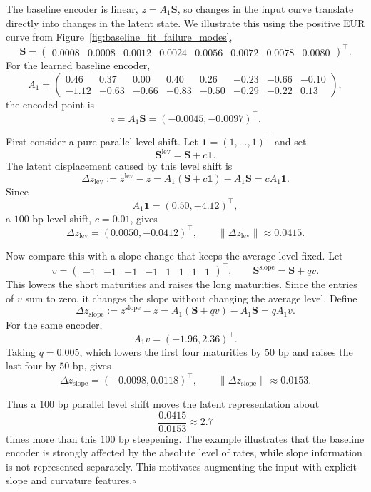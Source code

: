 \begin{example}\label{ex:level_shape_entanglement}
The baseline encoder is linear, \(z=A_1\mathbf S\), so changes in the input curve translate directly into changes in the latent state. We illustrate this using the positive EUR curve from Figure~\ref{fig:baseline_fit_failure_modes},
\[
\mathbf S
=
\begin{pmatrix}
0.0008 & 0.0008 & 0.0012 & 0.0024 &
0.0056 & 0.0072 & 0.0078 & 0.0080
\end{pmatrix}^{\top}.
\]
For the learned baseline encoder,
\[
A_1 =
\begin{pmatrix}
0.46 & 0.37 & 0.00 & 0.40 & 0.26 & -0.23 & -0.66 & -0.10 \\
-1.12 & -0.63 & -0.66 & -0.83 & -0.50 & -0.29 & -0.22 & 0.13
\end{pmatrix},
\]
the encoded point is
\[
z=A_1\mathbf S
=
(-0.0045,-0.0097)^\top.
\]

First consider a pure parallel level shift. Let \(\mathbf 1=(1,\ldots,1)^\top\) and set
\[
\mathbf S^{\mathrm{lev}}=\mathbf S+c\mathbf 1.
\]
The latent displacement caused by this level shift is
\[
\Delta z_{\mathrm{lev}}
:=
z^{\mathrm{lev}}-z
=
A_1(\mathbf S+c\mathbf 1)-A_1\mathbf S
=
cA_1\mathbf 1.
\]
Since
\[
A_1\mathbf 1=(0.50,-4.12)^\top,
\]
a \(100\) bp level shift, \(c=0.01\), gives
\[
\Delta z_{\mathrm{lev}}
=
(0.0050,-0.0412)^\top,
\qquad
\|\Delta z_{\mathrm{lev}}\|\approx 0.0415.
\]

Now compare this with a slope change that keeps the average level fixed. Let
\[
v=
\begin{pmatrix}
-1 & -1 & -1 & -1 & 1 & 1 & 1 & 1
\end{pmatrix}^{\top},
\qquad
\mathbf S^{\mathrm{slope}}=\mathbf S+qv.
\]
This lowers the short maturities and raises the long maturities. Since the entries of \(v\) sum to zero, it changes the slope without changing the average level. Define
\[
\Delta z_{\mathrm{slope}}
:=
z^{\mathrm{slope}}-z
=
A_1(\mathbf S+qv)-A_1\mathbf S
=
qA_1v.
\]
For the same encoder,
\[
A_1v=(-1.96,2.36)^\top.
\]
Taking \(q=0.005\), which lowers the first four maturities by \(50\) bp and raises the last four by \(50\) bp, gives
\[
\Delta z_{\mathrm{slope}}
=
(-0.0098,0.0118)^\top,
\qquad
\|\Delta z_{\mathrm{slope}}\|\approx 0.0153.
\]

Thus a \(100\) bp parallel level shift moves the latent representation about
\[
\frac{0.0415}{0.0153}\approx 2.7
\]
times more than this \(100\) bp steepening. The example illustrates that the baseline encoder is strongly affected by the absolute level of rates, while slope information is not represented separately. This motivates augmenting the input with explicit slope and curvature features.\;\;\(\circ\)
\end{example}

